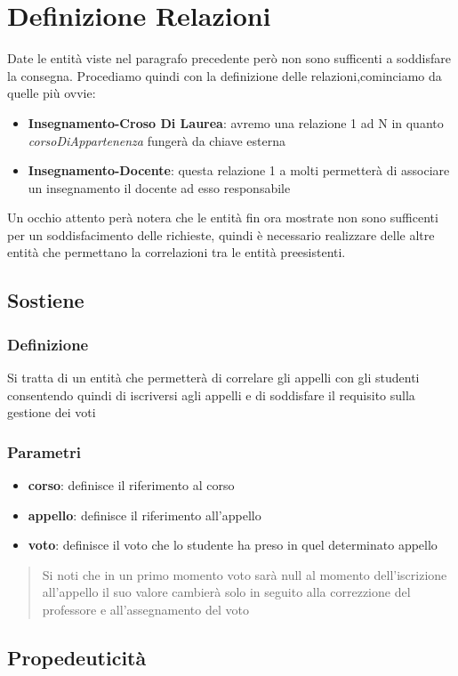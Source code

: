 \section{Definizione Relazioni}
Date le entità viste nel paragrafo precedente però non sono sufficenti a soddisfare la consegna. Procediamo quindi con la definizione delle relazioni,cominciamo da quelle più ovvie:
\begin{itemize}
    \item \textbf{Insegnamento-Croso Di Laurea}: avremo una relazione 1 ad N in quanto \textit{corsoDiAppartenenza} fungerà da chiave esterna 
    \item \textbf{Insegnamento-Docente}: questa relazione 1 a molti permetterà di associare un insegnamento il docente ad esso responsabile
\end{itemize}
Un occhio attento perà notera che le entità fin ora mostrate non sono sufficenti per un  soddisfacimento delle richieste, quindi è necessario realizzare delle altre entità che permettano la correlazioni tra le entità preesistenti.
\subsection{Sostiene} \label{sostiene}
\subsubsection{Definizione}
Si tratta di un entità che permetterà di correlare gli appelli con gli studenti consentendo quindi di iscriversi agli appelli e di soddisfare il requisito sulla gestione dei voti
\subsubsection{Parametri}
\begin{itemize}
    \item \textbf{corso}: definisce il riferimento al corso
    \item \textbf{appello}:  definisce il riferimento all'appello
    \item \textbf{voto}: definisce il voto che lo studente ha preso in quel determinato appello
\end{itemize}
\begin{quote}
    Si noti che in un primo momento voto sarà null al momento dell'iscrizione all'appello il suo valore cambierà solo in seguito alla correzzione del professore e all'assegnamento del voto
\end{quote}
\subsection{Propedeuticità} \label{sostiene}
